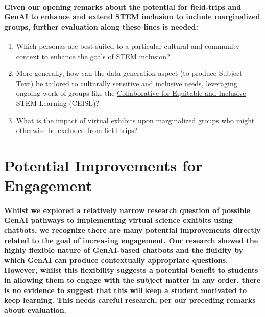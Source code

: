 \documentclass{article}
\begin{document}
\paragraph{Given our opening remarks about the potential for field-trips and GenAI to enhance and extend STEM inclusion to include marginalized groups, further evaluation along these lines is needed:}

\begin{enumerate}
    \item Which personas are best suited to a particular cultural and community context to enhance the goals of STEM inclusion?
    \item More generally, how can the data-generation aspect (to produce Subject Text) be tailored to culturally sensitive and inclusive needs, leveraging ongoing work of groups like the \href{https://ceisl.iupui.edu/index.html?_gl=1*1ig9u2q*_ga*MTk2NjI4NDU4NS4xNzA2MTMyMTE3*_ga_61CH0D2DQW*MTcwNjEzODg0MC4zLjAuMTcwNjEzODg0MC42MC4wLjA.&_ga=2.120975304.1362142678.1706132117-1966284585.1706132117}{Collaborative for Equitable and Inclusive STEM Learning} (CEISL)?
    \item What is the impact of virtual exhibits upon marginalized groups who might otherwise be excluded from field-trips?
\end{enumerate}

\section*{Potential Improvements for Engagement}

\paragraph{Whilst we explored a relatively narrow research question of possible GenAI pathways to implementing virtual science exhibits using chatbots, we recognize there are many potential improvements directly related to the goal of increasing engagement. Our research showed the highly flexible nature of GenAI-based chatbots and the fluidity by which GenAI can produce contextually appropriate questions. However, whilst this flexibility suggests a potential benefit to students in allowing them to engage with the subject matter in any order, there is no evidence to suggest that this will keep a student motivated to keep learning. This needs careful research, per our preceding remarks about evaluation.}
\end{document}
